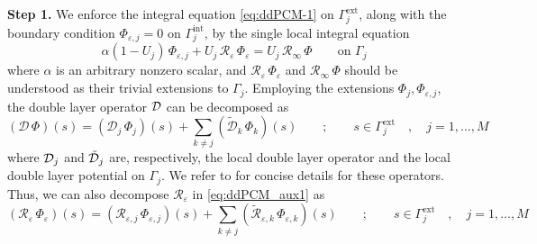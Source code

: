{\bf Step 1.} 
We enforce the integral equation \eqref{eq:ddPCM-1} on $\Gamma_j^\text{ext}$, along with the boundary condition $\Phi_{\varepsilon,j}=0$ on $\Gamma_j^\text{int}$, by the single local integral equation
\begin{equation}
	\label{eq:ddPCM_aux1}
	\alpha(1 - U_j)\,\Phi_{\varepsilon,j} + U_j \, {\mathcal{R}}_{\varepsilon} \, \Phi_{\varepsilon} = U_j \, {\mathcal{R}}_{\infty} \, \Phi \qquad \text{on }\Gamma_j
\end{equation}
where $\alpha$ is an arbitrary nonzero scalar, and ${\mathcal{R}}_{\varepsilon} \, \Phi_{\varepsilon}$ and $ {\mathcal{R}}_{\infty} \, \Phi$ should be understood as their trivial extensions to $\Gamma_j$. Employing the extensions $\Phi_j , \Phi_{\varepsilon,j}$, the double layer operator $\mathcal{D}$ can be decomposed as
\[
(\mathcal{D} \, \Phi ) (s) = ( \mathcal{D}_j \, \Phi_j )(s) + \sum_{k \ne j} (\tilde{\mathcal{D}}_k \, \Phi_k )(s) \qquad ; \qquad s \in \Gamma_j^\text{ext} \quad, \quad  j = 1 , \ldots , M
\]
where $\mathcal{D}_j$ and $\tilde{\mathcal{D}}_j$ are, respectively, the local double layer operator and the local double layer potential on $\Gamma_j$. 
We refer to\cite{Stamm_JCP_DDPCM} for concise details for these operators.
Thus, we can also decompose ${\mathcal{R}}_{\varepsilon}$ in \eqref{eq:ddPCM_aux1} as
\begin{equation}\label{eq:PCM_aux2}
({\mathcal{R}}_{\varepsilon} \, \Phi_{\varepsilon})(s)
=
({\mathcal{R}}_{\varepsilon,j} \, \Phi_{\varepsilon,j})(s) + \sum_{k \ne j} (\tilde{\mathcal{R}}_{\varepsilon,k} \, \Phi_{\varepsilon,k})(s)
 \qquad ; \qquad s \in \Gamma_j^\text{ext} \quad, \quad  j = 1 , \ldots , M
\end{equation}
